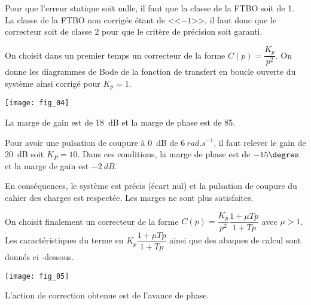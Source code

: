 \ifprof
\begin{corrige}
Pour que l'erreur statique soit nulle, il faut que la classe de la FTBO soit de 1. La classe de la FTBO non corrigée étant de <<$-1$>>, il faut donc que le correcteur soit de classe 2 pour que le critère de précision soit garanti.
\end{corrige}
\else
\fi

\ifprof
\else
On choisit dans un premier temps un correcteur de la forme $C(p)=\dfrac{K_p}{p^2}$. On donne les diagrammes de Bode de la fonction de transfert en boucle ouverte du système ainsi corrigé pour $K_p =1$. 

\begin{marginfigure}
\texttt{[image: fig\_04]}
\end{marginfigure}

\fi

\ifprof
\begin{corrige}
La marge de gain est de \SI{18}{dB} et la marge de phase est de 85\degres. 

Pour avoir une pulsation de coupure à \SI{0}{dB} de $\SI{6}{rad.s^{-1}}$, il faut relever le gain de \SI{20}{dB} soit $K_P=10$. Dans ces conditions, la marge de phase est de $-15\degres$ et la marge de gain est $\SI{-2}{dB}$. 

En conséquences, le système est précis (écart nul) et la pulsation de coupure du cahier des charges est respectée. Les marges ne sont plus satisfaites.  
\end{corrige}
\else
\fi

\ifprof
\else

On choisit finalement un correcteur de la forme $C(p)= \dfrac{K_p}{p^2}\dfrac{1+\mu Tp}{1+Tp}$ avec $\mu > 1$.
Les caractéristiques du terme en $K_p\dfrac{1+\mu Tp}{1+Tp}$  ainsi que des abaques de calcul sont donnés ci -dessous. 

\begin{center}
\texttt{[image: fig\_05]}
\end{center}
\fi

\ifprof
\begin{corrige}
L'action de correction obtenue est de l'avance de phase. 
\end{corrige}
\else
\fi


